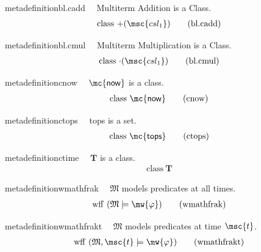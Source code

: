 \begin{restatable}{metadefinition}{bl.cadd}~~ Multiterm Addition is a Class.
\begin{align}
\,\mathrm{class}~ {+(} \msc{csl_1} )\label{eq:bl.cadd}\tag{bl.cadd}
\end{align}
\end{restatable}

\begin{restatable}{metadefinition}{bl.cmul}~~ Multiterm Multiplication is a Class.
\begin{align}
\,\mathrm{class}~ {\cdot(} \msc{csl_1} )\label{eq:bl.cmul}\tag{bl.cmul}
\end{align}
\end{restatable}

\begin{restatable}{metadefinition}{cnow}~~ $\mathsf{\mc{now}}$ is a class.
\begin{align}
\,\mathrm{class}~ \mathsf{\mc{now}}\label{eq:cnow}\tag{cnow}
\end{align}
\end{restatable}

\begin{restatable}{metadefinition}{ctops}~~ tops is a set.
\begin{align}
\,\mathrm{class}~ \mathsf{\mc{tops}}\label{eq:ctops}\tag{ctops}
\end{align}
\end{restatable}

\begin{restatable}{metadefinition}{ctime}~~ $\mathbf{T}$ is a class.
\begin{align}
\,\mathrm{class}~ \mathbf{T}\label{eq:ctime}\tag{ctime}
\end{align}
\end{restatable}

\begin{restatable}{metadefinition}{wmathfrak}~~ $\mathfrak{M}$ models predicates at
all times.
\begin{align}
\,\mathrm{wff}~ ( \mathfrak{M} \models \mw{\varphi}
    )\label{eq:wmathfrak}\tag{wmathfrak}
\end{align}
\end{restatable}

\begin{restatable}{metadefinition}{wmathfrakt}~~ $\mathfrak{M}$ models predicates at
time $\msc{t}$.
\begin{align}
\,\mathrm{wff}~ ( \mathfrak{M} , \msc{t} \models \mw{\varphi}
    )\label{eq:wmathfrakt}\tag{wmathfrakt}
\end{align}
\end{restatable}

